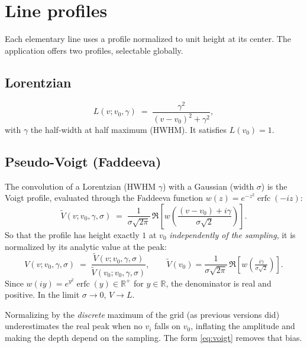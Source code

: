 \documentclass[11pt,a4paper]{article}
\DeclareMathOperator{\erfc}{erfc}
\begin{document}
\section{Line profiles}\label{sec:lineshape}

Each elementary line uses a profile normalized to unit height at its center. The
application offers two profiles, selectable globally.

\subsection{Lorentzian}
\begin{equation}
  L(v;v_0,\gamma) \;=\; \frac{\gamma^{2}}{(v-v_0)^{2}+\gamma^{2}},
  \label{eq:lorentz}
\end{equation}
with $\gamma$ the half-width at half maximum (HWHM). It satisfies $L(v_0)=1$.

\subsection{Pseudo-Voigt (Faddeeva)}
The convolution of a Lorentzian (HWHM $\gamma$) with a Gaussian (width
$\sigma$) is the Voigt profile, evaluated through the Faddeeva
function $w(z)=e^{-z^2}\erfc(-iz)$:
\begin{equation}
  \widetilde V(v;v_0,\gamma,\sigma) \;=\;
   \frac{1}{\sigma\sqrt{2\pi}}\,\Re\!\left[w\!\left(\frac{(v-v_0)+i\gamma}{\sigma\sqrt2}\right)\right].
\end{equation}
So that the profile has height exactly $1$ at $v_0$ \emph{independently
of the sampling}, it is normalized by its analytic value at the peak:
\begin{equation}
  V(v;v_0,\gamma,\sigma) \;=\; \frac{\widetilde V(v;v_0,\gamma,\sigma)}{\widetilde V(v_0;v_0,\gamma,\sigma)},
  \qquad
  \widetilde V(v_0) = \frac{1}{\sigma\sqrt{2\pi}}\,\Re\!\left[w\!\left(\tfrac{i\gamma}{\sigma\sqrt2}\right)\right].
  \label{eq:voigt}
\end{equation}
Since $w(iy)=e^{y^2}\erfc(y)\in\mathbb R^{+}$ for $y\in\mathbb R$, the denominator
is real and positive. In the limit $\sigma\to0$, $V\to L$.

\begin{nota}
Normalizing by the \emph{discrete} maximum of the grid (as previous versions
did) underestimates the real peak when no $v_i$ falls on $v_0$, inflating the
amplitude and making the depth depend on the sampling. The form
\eqref{eq:voigt} removes that bias.
\end{nota}
\end{document}

